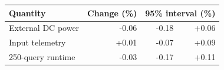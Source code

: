 \begin{tabular}{@{}lrrr@{}}
\toprule
Quantity & Change (\%) & \multicolumn{2}{c}{95\% interval (\%)} \\
\midrule
External DC power & -0.06 & -0.18 & +0.06 \\
Input telemetry & +0.01 & -0.07 & +0.09 \\
250-query runtime & -0.03 & -0.17 & +0.11 \\
\bottomrule
\end{tabular}
